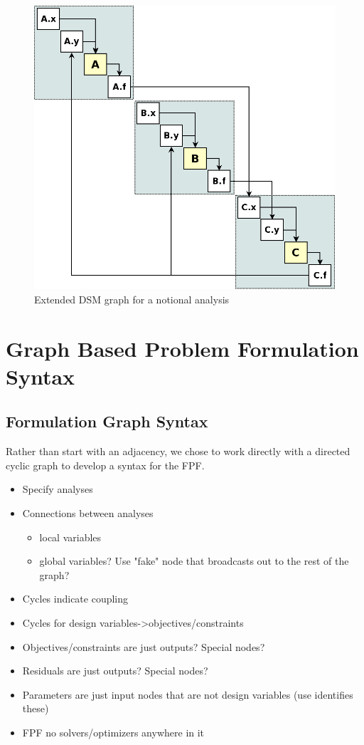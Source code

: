 \documentclass[]{aiaa-tc} %
\begin{document}
    \begin{figure}[!hbp]
        \begin{center}
        \includegraphics[width=.75\textwidth]{images/dsm_full}
        \caption{Extended DSM graph for a notional analysis \label{fig:dsm_full}}
        \end{center}
    \end{figure}

    
\section{Graph Based Problem Formulation Syntax}
    \subsection{Formulation Graph Syntax}
    Rather than start with an adjacency, we chose to work directly with a directed cyclic graph to develop a syntax for the FPF. 
    \begin{itemize}
        \item Specify analyses
        \item Connections between analyses 
            \begin{itemize}
                \item local variables
                \item global variables? Use "fake" node that broadcasts out to the rest of the graph? 
            \end{itemize}
        \item Cycles indicate coupling
        \item Cycles for design variables->objectives/constraints
        \item Objectives/constraints are just outputs? Special nodes? 
        \item Residuals are just outputs? Special nodes? 
        \item Parameters are just input nodes that are not design variables (use identifies these)
        \item FPF no solvers/optimizers anywhere in it
    \end{itemize}
\end{document}
